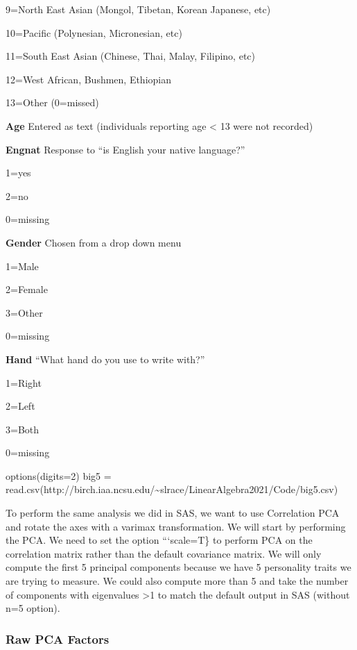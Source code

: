 \documentclass[
]{article}
\newenvironment{Shaded}{\begin{snugshade}}{\end{snugshade}}
\newcommand{\AttributeTok}[1]{\textcolor[rgb]{0.77,0.63,0.00}{#1}}
\newcommand{\DecValTok}[1]{\textcolor[rgb]{0.00,0.00,0.81}{#1}}
\newcommand{\FunctionTok}[1]{\textcolor[rgb]{0.00,0.00,0.00}{#1}}
\newcommand{\NormalTok}[1]{#1}
\newcommand{\OtherTok}[1]{\textcolor[rgb]{0.56,0.35,0.01}{#1}}
\newcommand{\StringTok}[1]{\textcolor[rgb]{0.31,0.60,0.02}{#1}}
\theoremstyle{definition}
\theoremstyle{definition}
\theoremstyle{definition}
\theoremstyle{definition}
\theoremstyle{remark}
\begin{document}
9=North East Asian (Mongol, Tibetan, Korean Japanese, etc)

10=Pacific (Polynesian, Micronesian, etc)

11=South East Asian (Chinese, Thai, Malay, Filipino, etc)

12=West African, Bushmen, Ethiopian

13=Other (0=missed)

\textbf{Age} Entered as text (individuals reporting age \textless{} 13 were not recorded)

\textbf{Engnat} Response to ``is English your native language?''

1=yes

2=no

0=missing

\textbf{Gender} Chosen from a drop down menu

1=Male

2=Female

3=Other

0=missing

\textbf{Hand} ``What hand do you use to write with?''

1=Right

2=Left

3=Both

0=missing

\begin{Shaded}
\begin{Highlighting}[]
\FunctionTok{options}\NormalTok{(}\AttributeTok{digits=}\DecValTok{2}\NormalTok{)}
\NormalTok{big5 }\OtherTok{=} \FunctionTok{read.csv}\NormalTok{(}\StringTok{\textquotesingle{}http://birch.iaa.ncsu.edu/\textasciitilde{}slrace/LinearAlgebra2021/Code/big5.csv\textquotesingle{}}\NormalTok{)}
\end{Highlighting}
\end{Shaded}

To perform the same analysis we did in SAS, we want to use Correlation PCA and rotate the axes with a varimax transformation. We will start by performing the PCA. We need to set the option ```scale=T\} to perform PCA on the correlation matrix rather than the default covariance matrix. We will only compute the first 5 principal components because we have 5 personality traits we are trying to measure. We could also compute more than 5 and take the number of components with eigenvalues \textgreater1 to match the default output in SAS (without n=5 option).

\hypertarget{raw-pca-factors}{%
\subsubsection{Raw PCA Factors}\label{raw-pca-factors}}
\end{document}
